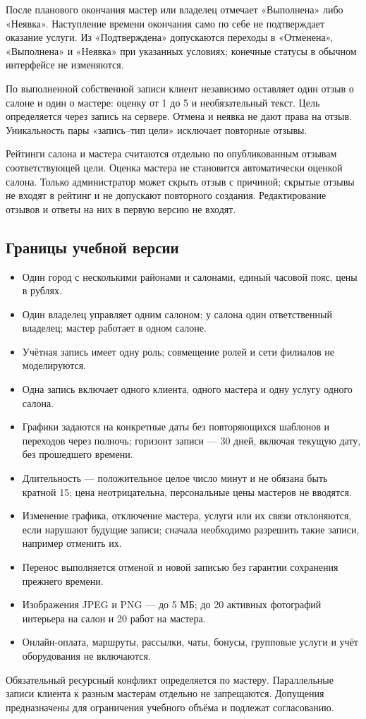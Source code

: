 После планового окончания мастер или владелец отмечает «Выполнена» либо «Неявка». Наступление времени окончания само по себе не подтверждает оказание услуги. Из «Подтверждена» допускаются переходы в «Отменена», «Выполнена» и «Неявка» при указанных условиях; конечные статусы в обычном интерфейсе не изменяются.

По выполненной собственной записи клиент независимо оставляет один отзыв о салоне и один о мастере: оценку от 1 до 5 и необязательный текст. Цель определяется через запись на сервере. Отмена и неявка не дают права на отзыв. Уникальность пары «запись--тип цели» исключает повторные отзывы.

Рейтинги салона и мастера считаются отдельно по опубликованным отзывам соответствующей цели. Оценка мастера не становится автоматически оценкой салона. Только администратор может скрыть отзыв с причиной; скрытые отзывы не входят в рейтинг и не допускают повторного создания. Редактирование отзывов и ответы на них в первую версию не входят.

\subsection{Границы учебной версии}
\begin{itemize}
\item Один город с несколькими районами и салонами, единый часовой пояс, цены в рублях.
\item Один владелец управляет одним салоном; у салона один ответственный владелец; мастер работает в одном салоне.
\item Учётная запись имеет одну роль; совмещение ролей и сети филиалов не моделируются.
\item Одна запись включает одного клиента, одного мастера и одну услугу одного салона.
\item Графики задаются на конкретные даты без повторяющихся шаблонов и переходов через полночь; горизонт записи --- 30 дней, включая текущую дату, без прошедшего времени.
\item Длительность --- положительное целое число минут и не обязана быть кратной 15; цена неотрицательна, персональные цены мастеров не вводятся.
\item Изменение графика, отключение мастера, услуги или их связи отклоняются, если нарушают будущие записи; сначала необходимо разрешить такие записи, например отменить их.
\item Перенос выполняется отменой и новой записью без гарантии сохранения прежнего времени.
\item Изображения JPEG и PNG --- до 5 МБ; до 20 активных фотографий интерьера на салон и 20 работ на мастера.
\item Онлайн-оплата, маршруты, рассылки, чаты, бонусы, групповые услуги и учёт оборудования не включаются.
\end{itemize}
Обязательный ресурсный конфликт определяется по мастеру. Параллельные записи клиента к разным мастерам отдельно не запрещаются. Допущения предназначены для ограничения учебного объёма и подлежат согласованию.

